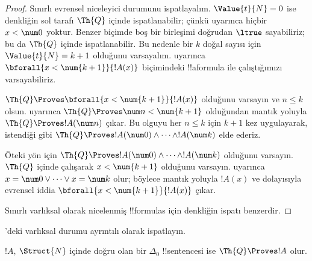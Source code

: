 \begin{proof}
    Sınırlı evrensel niceleyici durumunu ispatlayalım.
    $\Value{t}{N}=0$ ise denkliğin sol tarafı $\Th{Q}$ içinde
    ispatlanabilir; çünkü  uyarınca
    hiçbir $x<\num 0$ yoktur. Benzer biçimde boş bir birleşimi doğrudan
    $\ltrue$ sayabiliriz; bu da $\Th{Q}$ içinde ispatlanabilir.
    Bu nedenle bir $k$ doğal sayısı için $\Value{t}{N}=k+1$ olduğunu
    varsayalım.  uyarınca
    $\bforall{x<\num{k+1}}{!A(x)}$ biçimindeki !!a{formula} ile
    çalıştığımızı varsayabiliriz.

    $\Th{Q} \Proves \bforall{x<\num{k+1}}{!A(x)}$ olduğunu varsayın ve
    $n\leq k$ olsun.  uyarınca
    $\Th{Q} \Proves \num n<\num{k+1}$ olduğundan mantık yoluyla
    $\Th{Q} \Proves !A(\num n)$ çıkar. Bu olguyu her $n\leq k$ için
    $k+1$ kez uygulayarak, istendiği gibi
    $\Th{Q} \Proves !A(\num 0)\land\dots\land !A(\num k)$ elde ederiz.

    Öteki yön için $\Th{Q} \Proves
    !A(\num 0)\land\dots\land !A(\num k)$ olduğunu varsayın. $\Th{Q}$
    içinde çalışarak $x<\num{k+1}$ olduğunu varsayın.
     uyarınca
    $x=\num 0\lor\dots\lor x=\num k$ olur; böylece mantık yoluyla $!A(x)$
    ve dolayısıyla evrensel iddia $\bforall{x<\num{k+1}}{!A(x)}$ çıkar.

    Sınırlı varlıksal olarak nicelenmiş !!{formula}s için denkliğin ispatı
    benzerdir.
\end{proof}

\begin{prob}
'deki varlıksal durumu ayrıntılı olarak
ispatlayın.
\end{prob}

\begin{lem}
$!A$, $\Struct{N}$ içinde doğru olan bir $\Delta_0$ !!{sentence}{}si ise
$\Th{Q} \Proves !A$ olur.
\end{lem}

